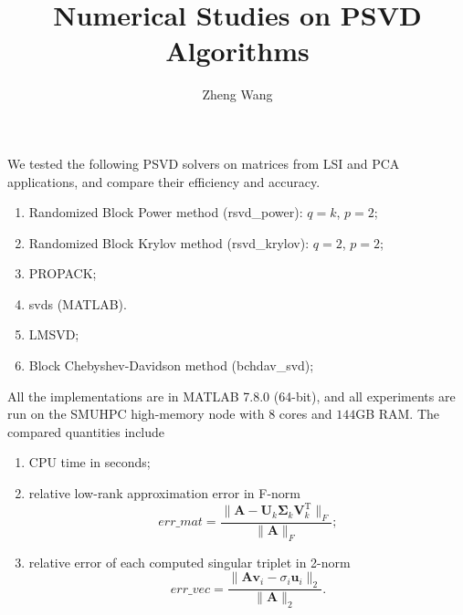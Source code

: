 \documentclass[11pt]{article}
\numberwithin{equation}{section}
\numberwithin{figure}{section}
\numberwithin{table}{section}
\begin{document}
\title{Numerical Studies on PSVD Algorithms}

\author{Zheng Wang}

\maketitle

We tested the following PSVD solvers on matrices from LSI and PCA applications, and compare their efficiency and accuracy.

\begin{enumerate}
\item Randomized Block Power method (rsvd\_power): $q = k$, $p = 2$;
\item Randomized Block Krylov method (rsvd\_krylov): $q = 2$, $p = 2$;
\item PROPACK;
\item svds (MATLAB).
\item LMSVD;
\item Block Chebyshev-Davidson method (bchdav\_svd);
\end{enumerate}

All the implementations are in MATLAB 7.8.0 (64-bit), and all experiments are run on the SMUHPC high-memory node with $8$ cores and $144$GB RAM. The compared quantities include \begin{enumerate}
\item CPU time in seconds;
\item relative low-rank approximation error in F-norm
\begin{equation}
err\_mat = \frac{\|\mathbf{A} - \mathbf{U}_k\mathbf{\Sigma}_k\mathbf{V}_k^\mathrm{T}\|_F}{\|\mathbf{A}\|_F};
\end{equation}
\item relative error of each computed singular triplet in 2-norm
\begin{equation}
err\_vec = \frac{\|\mathbf{A}\mathbf{v}_i-\sigma_i\mathbf{u}_i\|_2}{\|\mathbf{A}\|_2}.
\end{equation}
\end{enumerate}
\end{document}

